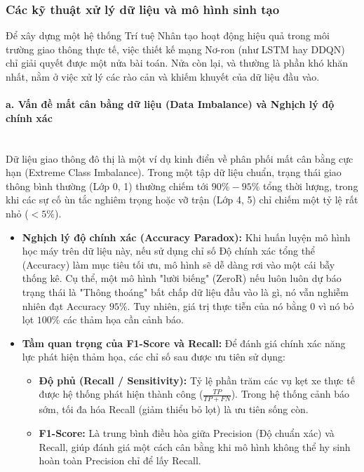 \subsubsection{Các kỹ thuật xử lý dữ liệu và mô hình sinh tạo}
Để xây dựng một hệ thống Trí tuệ Nhân tạo hoạt động hiệu quả trong môi trường giao thông thực tế, việc thiết kế mạng Nơ-ron (như LSTM hay DDQN) chỉ giải quyết được một nửa bài toán. Nửa còn lại, và thường là phần khó khăn nhất, nằm ở việc xử lý các rào cản và khiếm khuyết của dữ liệu đầu vào.

\paragraph{a. Vấn đề mất cân bằng dữ liệu (Data Imbalance) và Nghịch lý độ chính xác} \mbox{} \\
Dữ liệu giao thông đô thị là một ví dụ kinh điển về phân phối mất cân bằng cực hạn (Extreme Class Imbalance). Trong một tập dữ liệu chuẩn, trạng thái giao thông bình thường (Lớp 0, 1) thường chiếm tới $90\% - 95\%$ tổng thời lượng, trong khi các sự cố ùn tắc nghiêm trọng hoặc vỡ trận (Lớp 4, 5) chỉ chiếm một tỷ lệ rất nhỏ ($< 5\%$).
\begin{itemize}
    \item \textbf{Nghịch lý độ chính xác (Accuracy Paradox):} Khi huấn luyện mô hình học máy trên dữ liệu này, nếu sử dụng chỉ số Độ chính xác tổng thể (Accuracy) làm mục tiêu tối ưu, mô hình sẽ dễ dàng rơi vào một cái bẫy thống kê. Cụ thể, một mô hình "lười biếng" (ZeroR) nếu luôn luôn dự báo trạng thái là "Thông thoáng" bất chấp dữ liệu đầu vào là gì, nó vẫn nghiễm nhiên đạt Accuracy $95\%$. Tuy nhiên, giá trị thực tiễn của nó bằng 0 vì nó bỏ lọt $100\%$ các thảm họa cần cảnh báo.
    \item \textbf{Tầm quan trọng của F1-Score và Recall:} Để đánh giá chính xác năng lực phát hiện thảm họa, các chỉ số sau được ưu tiên sử dụng:
    \begin{itemize}
        \item \textbf{Độ phủ (Recall / Sensitivity):} Tỷ lệ phần trăm các vụ kẹt xe thực tế được hệ thống phát hiện thành công ($\frac{TP}{TP + FN}$). Trong hệ thống cảnh báo sớm, tối đa hóa Recall (giảm thiểu bỏ lọt) là ưu tiên sống còn.
        \item \textbf{F1-Score:} Là trung bình điều hòa giữa Precision (Độ chuẩn xác) và Recall, giúp đánh giá một cách cân bằng khi mô hình không thể hy sinh hoàn toàn Precision chỉ để lấy Recall.
    \end{itemize}
\end{itemize}

